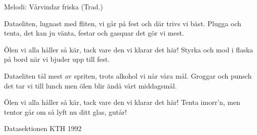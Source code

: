\begin{song}

\begin{songmeta}
Melodi: Vårvindar friska (Trad.)
\end{songmeta}

\begin{songtext}
Dataeliten, lugnast med fliten,
vi går på fest och där trivs vi bäst.
Plugga och tenta, det kan ju vänta,
festar och gasquar det gör vi mest.

Ölen vi alla håller så kär,
tack vare den vi klarar det här!
Styrka och mod i flaska på bord
när vi bjuder upp till fest.

Dataeliten tål mest av spriten,
trots alkohol vi når våra mål.
Groggar och punsch det tar vi till lunch men
ölen blir ändå vårt middagsmål.

Ölen vi alla håller så kär,
tack vare den vi klarar det här!
Tenta imorr'n, men tentor går om
så lyft nu ditt glas, gutår!
\end{songtext}

\begin{songnotes}
Datasektionen KTH 1992
\end{songnotes}
\end{song}
